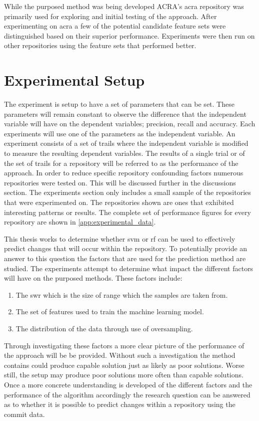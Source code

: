 While the purposed method was being developed ACRA's acra repository was primarily used for exploring and initial testing of the approach. After experimenting on acra a few of the potential candidate feature sets were distinguished based on their superior performance. Experiments were then run on other repositories using the feature sets that performed better.

\section{Experimental Setup}


The experiment is setup to have a set of parameters that can be set. These parameters will remain constant to observe the difference that the independent variable will have on the dependent variables; precision, recall and accuracy. Each experiments will use one of the parameters as the independent variable. An experiment consists of a set of trails where the independent variable is modified to measure the resulting dependent variables. The results of a single trial or of the set of trails for a repository will be referred to as the performance of the approach. In order to reduce specific repository confounding factors numerous repositories were tested on. This will be discussed further in the discussions section. The experiments section only includes a small sample of the repositories that were experimented on. The repositories shown are ones that exhibited interesting patterns or results. The complete set of performance figures for every repository are shown in \autoref{app:experimental_data}.

This thesis works to determine whether \gls{svm} or \gls{rf} can be used to effectively predict changes that will occur within the repository. To potentially provide an answer to this question the factors that are used for the prediction method are studied. The experiments attempt to determine what impact the different factors will have on the purposed methods. These factors include:
\begin{enumerate}
\item The \gls{swr} which is the size of range which the samples are taken from.
\item The set of features used to train the machine learning model.
\item The distribution of the data through use of oversampling.
\end{enumerate}

Through investigating these factors a more clear picture of the performance of the approach will be be provided. Without such a investigation the method contains could produce capable solution just as likely as poor solutions. Worse still, the setup may produce poor solutions more often than capable solutions. Once a more concrete understanding is developed of the different factors and the performance of the algorithm accordingly the research question can be answered as to whether it is possible to predict changes within a repository using the commit data.


